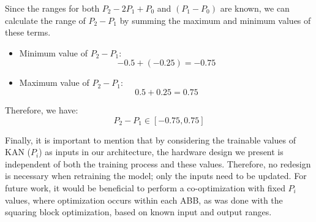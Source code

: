Since the ranges for both $P_2 - 2P_1 + P_0$ and $(P_1 - P_0)$ are known, we can calculate the range of $P_2 - P_1$ by summing the maximum and minimum values of these terms. 

\begin{itemize}
    \item Minimum value of $P_2 - P_1$: 
    \begin{equation*}
        -0.5 + (-0.25) = -0.75
    \end{equation*}
    \item Maximum value of $P_2 - P_1$: 
    \begin{equation*}
        0.5 + 0.25 = 0.75
    \end{equation*}
\end{itemize}

Therefore, we have:
\begin{equation*}
    P_2 - P_1 \in [-0.75, 0.75]
\end{equation*}

Finally, it is important to mention that by considering the trainable values of KAN ($P_{i}$) as inputs in our architecture, the hardware design we present is independent of both the training process and these values. 
Therefore, no redesign is necessary when retraining the model; only the inputs need to be updated. 
For future work, it would be beneficial to perform a co-optimization with fixed $P_{i}$ values, where optimization occurs within each ABB, as was done with the squaring block optimization, based on known input and output ranges. 


